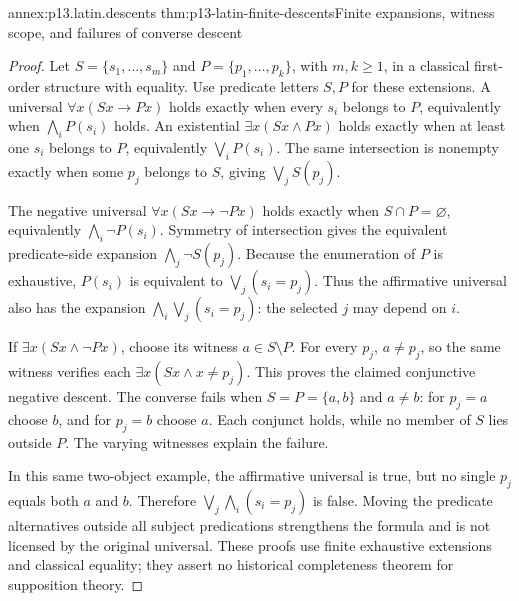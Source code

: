 \begin{annexitem}{annex:p13.latin.descents}
 {thm:p13-latin-finite-descents}{Finite expansions, witness scope, and failures of converse descent}
\begin{proof}
Let \(S=\{s_1,\ldots,s_m\}\) and \(P=\{p_1,\ldots,p_k\}\),
with \(m,k\geq1\), in a classical first-order structure with equality.
Use predicate letters \(S,P\) for these extensions.
A universal \(\forall x(Sx\to Px)\) holds exactly when every \(s_i\)
belongs to \(P\), equivalently when \(\bigwedge_iP(s_i)\) holds.
An existential \(\exists x(Sx\land Px)\) holds exactly when at least
one \(s_i\) belongs to \(P\), equivalently \(\bigvee_iP(s_i)\).
The same intersection is nonempty exactly when some \(p_j\) belongs
to \(S\), giving \(\bigvee_jS(p_j)\).

The negative universal \(\forall x(Sx\to\neg Px)\) holds exactly when
\(S\cap P=\varnothing\), equivalently \(\bigwedge_i\neg P(s_i)\).
Symmetry of intersection gives the equivalent predicate-side expansion
\(\bigwedge_j\neg S(p_j)\).
Because the enumeration of \(P\) is exhaustive, \(P(s_i)\) is equivalent
to \(\bigvee_j(s_i=p_j)\). Thus the affirmative universal also has
the expansion \(\bigwedge_i\bigvee_j(s_i=p_j)\): the selected \(j\)
may depend on \(i\).

If \(\exists x(Sx\land\neg Px)\), choose its witness \(a\in S\setminus P\).
For every \(p_j\), \(a\ne p_j\), so the same witness verifies each
\(\exists x(Sx\land x\ne p_j)\). This proves the claimed conjunctive
negative descent. The converse fails when \(S=P=\{a,b\}\) and \(a\ne b\):
for \(p_j=a\) choose \(b\), and for \(p_j=b\) choose \(a\).
Each conjunct holds, while no member of \(S\) lies outside \(P\).
The varying witnesses explain the failure.

In this same two-object example, the affirmative universal is true,
but no single \(p_j\) equals both \(a\) and \(b\).
Therefore \(\bigvee_j\bigwedge_i(s_i=p_j)\) is false.
Moving the predicate alternatives outside all subject predications
strengthens the formula and is not licensed by the original universal.
These proofs use finite exhaustive extensions and classical equality;
they assert no historical completeness theorem for supposition theory.
\end{proof}
\end{annexitem}


